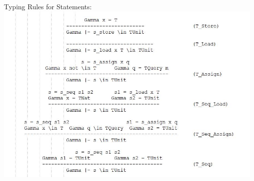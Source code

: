 \begin{frame}{Typing Rules for Statements: }
\includegraphics[scale =0.35]{Images/TypingRules_Statements.JPG} 
\end{frame}

